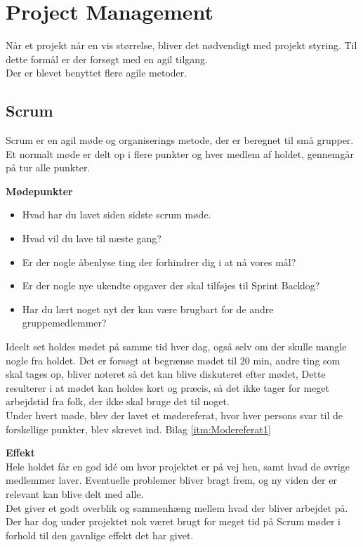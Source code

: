 \newpage
\section{Project Management}

Når et projekt når en vis størrelse, bliver det nødvendigt med projekt styring. Til dette formål er der forsøgt med en agil tilgang.\\

Der er blevet benyttet flere agile metoder.

\subsection{Scrum}

Scrum er en agil møde og organiserings metode, der er beregnet til små grupper. Et normalt møde er delt op i flere punkter og hver medlem af holdet, gennemgår på tur alle punkter.

\textbf{Mødepunkter}
\begin{itemize}[noitemsep]
	\item Hvad har du lavet siden sidste scrum møde.
	\item Hvad vil du lave til næste gang?
	\item Er der nogle åbenlyse ting der forhindrer dig i at nå vores mål?
	\item Er der nogle nye ukendte opgaver der skal tilføjes til Sprint Backlog?
	\item Har du lært noget nyt der kan være brugbart for de andre gruppemedlemmer?
\end{itemize}

Ideelt set holdes mødet på samme tid hver dag, også selv om der skulle mangle nogle fra holdet.
Det er forsøgt at begrænse mødet til 20 min, andre ting som skal tages op, bliver noteret så det kan blive diskuteret efter mødet, Dette resulterer i at mødet kan holdes kort og præcis, så det ikke tager for meget arbejdstid fra folk, der ikke skal bruge det til noget.\\

Under hvert møde, blev der lavet et mødereferat, hvor hver persons svar til de forskellige punkter, blev skrevet ind. Bilag \ref{itm:Modereferat1}


\textbf{Effekt}\\

Hele holdet får en god idé om hvor projektet er på vej hen, samt hvad de øvrige medlemmer laver.
Eventuelle problemer bliver bragt frem, og ny viden der er relevant kan blive delt med alle.\\
Det giver et godt overblik og sammenhæng mellem hvad der bliver arbejdet på. Der har dog under projektet nok været brugt for meget tid på Scrum møder i forhold til den gavnlige effekt det har givet.



